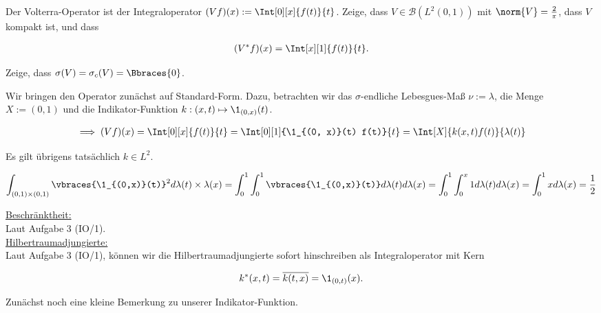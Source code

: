 \begin{exercise}[IO/3]

Der Volterra-Operator ist der Integraloperator $(V f)(x) := \Int[0][x]{f(t)}{t}$.
Zeige, dass $V \in \mathcal{B}(L^2(0, 1))$ mit $\norm{V} = \frac{2}{\pi}$, dass $V$ kompakt ist, und dass

\begin{align*}
  (V^\ast f)(x)
  =
  \Int[x][1]{f(t)}{t}.
\end{align*}

Zeige, dass $\sigma(V) = \sigma_c(V) = \Bbraces{0}$.

\end{exercise}

\begin{solution}

Wir bringen den Operator zunächst auf Standard-Form.
Dazu, betrachten wir das $\sigma$-endliche Lebesgues-Maß
$\nu := \lambda$, die Menge $X := (0, 1)$ und die Indikator-Funktion $k: (x, t) \mapsto \1_{(0, x)}(t)$.

\begin{align*}
  \implies
  (V f)(x)
  =
  \Int[0][x]{f(t)}{t}
  =
  \Int[0][1]{\1_{(0, x)}(t) f(t)}{t}
  =
  \Int[X]{k(x, t) f(t)}{\lambda(t)}
\end{align*}

Es gilt übrigens tatsächlich $k \in L^2$.

\begin{align*}
  \int_{(0,1) \times (0,1)} \vbraces{\1_{(0,x)}(t)}^2 d\lambda(t) \times \lambda(x)
  =
  \int_0^1 \int_0^1 \vbraces{\1_{(0,x)}(t)} d\lambda(t) d\lambda(x)
  =
  \int_0^1 \int_0^x 1 d\lambda(t) d\lambda(x)
  =
  \int_0^1 x d\lambda(x)
  =
  \frac{1}{2}
\end{align*}

\underline{Beschränktheit:} \\

Laut Aufgabe 3 (IO/1). \\

\underline{Hilbertraumadjungierte:} \\

Laut Aufgabe 3 (IO/1), können wir die Hilbertraumadjungierte sofort hinschreiben als Integraloperator mit Kern

\begin{align*}
  k^\ast(x, t)
  =
  \overline{k(t, x)}
  =
  \1_{(0, t)}(x).
\end{align*}

Zunächst noch eine kleine Bemerkung zu unserer Indikator-Funktion.


\end{solution}
